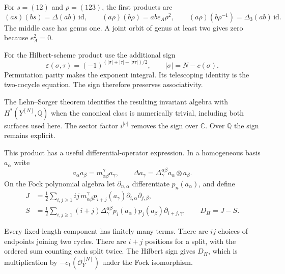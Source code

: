 For \(s=(12)\) and \(\rho=(123)\), the first products are
\[
 (as)(bs)=\Delta(ab)\,\mathrm{id},\qquad
 (a\rho)(b\rho)=abe_A\rho^2,\qquad
 (a\rho)(b\rho^{-1})=\Delta_3(ab)\,\mathrm{id}.
\]
The middle case has genus one. A joint orbit of genus at
least two gives zero because \(e_A^2=0\).

For the Hilbert-scheme product use the additional sign
\[
 \varepsilon(\sigma,\tau)=
 (-1)^{(|\sigma|+|\tau|-|\sigma\tau|)/2},\qquad
 |\sigma|=N-c(\sigma).
\]
Permutation parity makes the exponent integral.
Its telescoping identity is the two-cocycle equation.
The sign therefore preserves associativity.

The Lehn--Sorger theorem identifies the resulting invariant
algebra with \(H^*(Y^{[N]},\mathbb Q)\) when the canonical
class is numerically trivial, including both surfaces used
here. The sector factor \(i^{|\sigma|}\) removes the sign
over \(\mathbb C\). Over \(\mathbb Q\) the sign remains explicit.

This product has a useful differential-operator expression.
In a homogeneous basis \(a_\alpha\) write
\[
 a_\alpha a_\beta=m_{\alpha\beta}^{\gamma}a_\gamma,\qquad
 \Delta a_\gamma=\Delta_\gamma^{\alpha\beta}
                              a_\alpha\otimes a_\beta.
\]
On the Fock polynomial algebra let \(\partial_{n,\alpha}\)
differentiate \(p_n(a_\alpha)\), and define
\begin{equation}\label{mht:eq:compact-join}
\begin{aligned}
 J&=\frac12\sum_{i,j\geq1}ij\,m_{\alpha\beta}^{\gamma}
              p_{i+j}(a_\gamma)\partial_{i,\alpha}\partial_{j,\beta},\\
 S&=\frac12\sum_{i,j\geq1}(i+j)\Delta_\gamma^{\alpha\beta}
              p_i(a_\alpha)p_j(a_\beta)\partial_{i+j,\gamma},
 \qquad D_H=J-S.
\end{aligned}
\end{equation}

Every fixed-length component has finitely many terms.
There are \(ij\) choices of endpoints joining two cycles.
There are \(i+j\) positions for a split, with the ordered
sum counting each split twice.
The Hilbert sign gives \(D_H\), which is multiplication by
\(-c_1(\mathcal O_Y^{[N]})\) under the Fock isomorphism.

